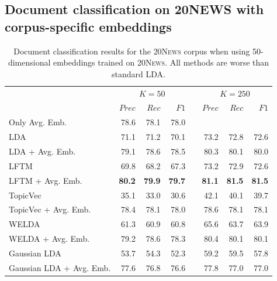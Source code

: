 \documentclass[
        a4paper,
        titlepage,
        twoside,
        parskip,
        numbers=noenddot
        ]{scrbook}
\newcommand{\ra}[1]{\renewcommand{\arraystretch}{#1}}
\theoremstyle{break}
\begin{document}
\begin{appendices}
  \subsection{Document classification on 20N{\footnotesize EWS} with corpus-specific embeddings}
  \label{sec:appendix_document_classification_corpus_specific}
  \begin{table}[]
    \ra{1.3}
    \centering
    \caption{Document classification results for the \textsc{20News} corpus when using 50-dimensional embeddings trained on \textsc{20News}.
    All methods are worse than standard LDA.}
    \label{table:document_classification_dim-50}
    \begin{tabular}{lrrrcrrr}
      \toprule
      \multirow{2}{*}{} & \multicolumn{3}{c}{$K = 50$} & \phantom{a} & \multicolumn{3}{c}{$K = 250$} \\ \cmidrule{2-4} \cmidrule{6-8}
                        & $Prec$    & $Rec$     & $F1$     && $Prec$    & $Rec$   & $F1$     \\ \midrule
                        Only Avg. Emb.           & 78.6    & 78.1    & 78.0   && \multicolumn{3}{l}{}        \\
                        LDA                      & 71.1    & 71.2    & 70.1   && 73.2    & 72.8     & 72.6   \\
                        LDA + Avg. Emb.          & 79.1    & 78.6    & 78.5   && 80.3    & 80.1     & 80.0   \\
                        LFTM                     & 69.8    & 68.2    & 67.3   && 73.2    & 72.9     & 72.6   \\
                        LFTM + Avg. Emb.         & \textbf{80.2}    & \textbf{79.9}    & \textbf{79.7}   && \textbf{81.1}    & \textbf{81.5}     & \textbf{81.5}   \\
                        TopicVec                 & 35.1    & 33.0    & 30.6   && 42.1    & 40.1     & 39.7   \\
                        TopicVec + Avg. Emb.     & 78.4    & 78.1    & 78.0   && 78.6    & 78.1     & 78.1   \\
                        WELDA                    & 61.3    & 60.9    & 60.8   && 65.6    & 63.7     & 63.9   \\ %
                        WELDA + Avg. Emb.        & 79.2    & 78.6    & 78.3   && 80.4    & 80.1     & 80.1   \\
                        Gaussian LDA             & 53.7    & 54.3    & 52.3   && 59.2    & 59.5     & 57.8   \\
                        Gaussian LDA + Avg. Emb. & 77.6    & 76.8    & 76.6   && 77.8    & 77.0     & 77.0   \\
    \bottomrule
    \end{tabular}
  \end{table}

\end{appendices}
\end{document}
